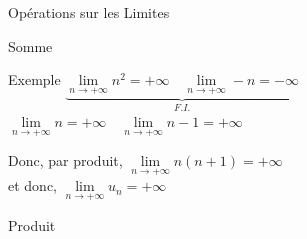 \documentclass{coursbook}
\begin{document}
\begin{Gpartie}{Opérations sur les Limites}
\begin{Spartie}{Somme}
\begin{SSpartie}{Exemple}
                $\underbrace{\lim\limits_{n\to +\infty}n^2=+\infty\quad\lim\limits_{n\to +\infty}-n=-\infty}_{F.I.}$
                \qquad$\lim\limits_{n\to +\infty}n=+\infty\quad\lim\limits_{n\to +\infty}n-1=+\infty$

                Donc, par produit, $\lim\limits_{n\to +\infty}n(n+1)=+\infty$ \\ et donc, $\lim\limits_{n\to +\infty}u_n=+\infty$
            \end{SSpartie}
        \end{Spartie}
        \begin{Spartie}{Produit}
            \begin{table}[H] \centering {}
\end{table}
\end{Spartie}
\end{Gpartie}
\end{document}
